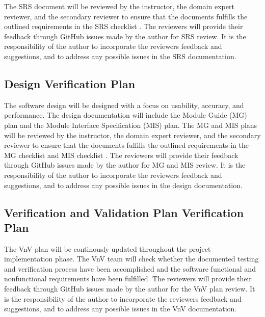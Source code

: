 \documentclass[12pt, titlepage]{article}
\begin{document}
The SRS document will be reviewed by the instructor, the domain expert reviewer, and the secondary reviewer to ensure that the documents fulfills
the outlined requirements in the SRS checklist \cite{SRSChecklist}. The reviewers will provide their feedback through GitHub issues made by the author for SRS review.
It is the responsibility of the author to incorporate the reviewers feedback and suggestions, and to address any possible issues in the SRS documentation.

\subsection{Design Verification Plan} \label{section4.3}
The software design will be designed with a focus on usability, accuracy, and performance. The design documentation will include the Module Guide (MG) plan and the Module Interface Specification (MIS) plan.
The MG and MIS plans will be reviewed by the instructor, the domain expert reviewer, and the secondary reviewer to ensure that the documents fulfills
the outlined requirements in the MG checklist \cite{BrainInsightMG2024}and MIS checklist \cite{BrainInsightMIS2024}. The reviewers will provide their feedback through GitHub issues made by the author for MG and MIS review.
It is the responsibility of the author to incorporate the reviewers feedback and suggestions, and to address any possible issues in the design documentation.




\subsection{Verification and Validation Plan Verification Plan} \label{section4.4}

The VnV plan will be continously updated throughout the project implementation phase.
The VnV team will check whether the documented testing and verification process have been accomplished and the software functional and nonfunctional
requirements have been fulfilled. The reviewers will provide their feedback through GitHub issues made by the author for the VnV plan review.
It is the responsibility of the author to incorporate the reviewers feedback and suggestions, and to address any possible issues in the VnV documentation.
\end{document}
